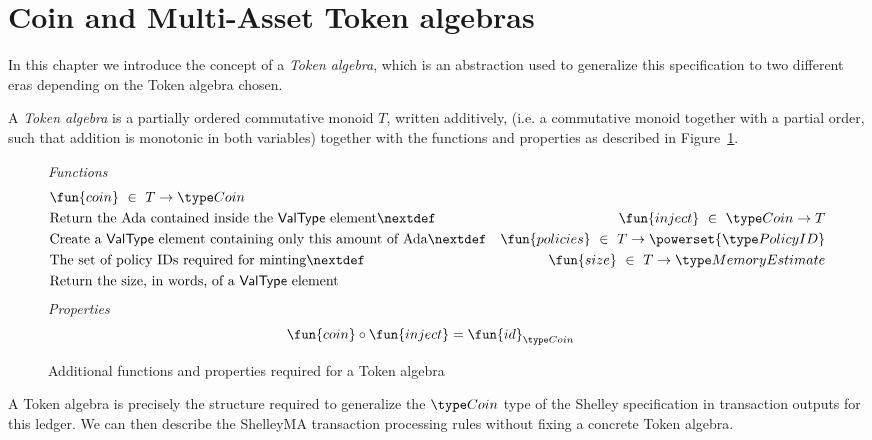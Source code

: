 \section{Coin and Multi-Asset Token algebras}
\label{sec:coin-ma}

In this chapter we introduce the concept of a \emph{Token algebra},
which is an abstraction used to generalize this specification to two
different eras depending on the Token algebra chosen.

\begin{definition}
  A \emph{Token algebra} is a partially ordered commutative monoid
  $T$, written additively, (i.e. a commutative monoid together with a
  partial order, such that addition is monotonic in both variables)
  together with the functions and properties as described in Figure~\ref{fig:TokenAlgebra}.
\end{definition}

\begin{figure}[htb]
  \emph{Functions}
  \begin{align*}
      & \fun{coin} ~\in~ T \to \Coin\\
      & \text{Return the Ada contained inside the $\mathsf{ValType}$ element}
      \nextdef
      & \fun{inject} ~\in~ \Coin \to T\\
      & \text{Create a $\mathsf{ValType}$ element containing only this amount of Ada}
      \nextdef
      & \fun{policies} ~\in~ T \to \powerset{\PolicyID} \\
      & \text{The set of policy IDs required for minting}
      \nextdef
      & \fun{size} ~\in~ T \to \MemoryEstimate\\
      & \text{Return the size, in words, of a $\mathsf{ValType}$ element}
  \end{align*}
  \emph{Properties}
  \begin{align*}
      & \fun{coin} \circ \fun{inject} = \fun{id}_{\Coin}
  \end{align*}
  \caption{Additional functions and properties required for a Token algebra}
  \label{fig:TokenAlgebra}
\end{figure}

A Token algebra is precisely the structure required to generalize the
$\Coin$ type of the Shelley specification in transaction outputs for
this ledger. We can then describe the ShelleyMA
transaction processing rules without fixing a concrete Token algebra.

